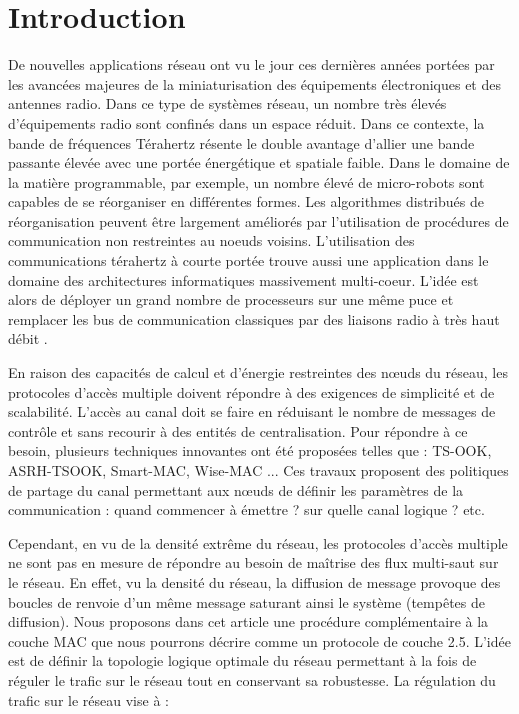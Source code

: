 \documentclass[sigconf]{acmart}
\begin{document}



\maketitle

\section{Introduction}

De nouvelles applications réseau ont vu le jour ces dernières années portées par les avancées majeures de la miniaturisation des équipements électroniques et des antennes radio. Dans ce type de systèmes réseau, un nombre très élevés d'équipements radio sont confinés dans un espace réduit. Dans ce contexte, la bande de fréquences Térahertz résente le double avantage d'allier une bande passante élevée avec une portée énergétique et spatiale faible. Dans le domaine de la matière programmable, par exemple, un nombre élevé de micro-robots sont capables de se réorganiser en différentes formes. Les algorithmes distribués de réorganisation peuvent être largement améliorés par l'utilisation de procédures de communication non restreintes au noeuds voisins. L'utilisation des communications térahertz à courte portée trouve aussi une application dans le domaine des architectures informatiques massivement multi-coeur. L'idée est alors de déployer un grand nombre de processeurs sur une même puce et remplacer les bus de communication classiques par des liaisons radio à très haut débit \cite{abadal}. 

En raison des capacités de calcul et d'énergie restreintes des nœuds du réseau, les protocoles d'accès multiple doivent répondre à des exigences de simplicité et de scalabilité. L'accès au canal doit se faire en réduisant le nombre de messages de contrôle et sans recourir à des entités de centralisation. Pour répondre à ce besoin, plusieurs techniques innovantes ont été proposées telles que : TS-OOK, ASRH-TSOOK, Smart-MAC, Wise-MAC ... Ces travaux proposent des politiques de partage du canal permettant aux nœuds de définir les paramètres de la communication : quand commencer à émettre ? sur quelle canal logique ? etc.

Cependant, en vu de la densité extrême du réseau, les protocoles d'accès multiple ne sont pas en mesure de répondre au besoin de maîtrise des flux multi-saut sur le réseau. En effet, vu la densité du réseau, la diffusion de message provoque des boucles de renvoie d'un même message saturant ainsi le système (tempêtes de diffusion). Nous proposons dans cet article une procédure complémentaire à la couche MAC que nous pourrons décrire comme un protocole de couche 2.5. L'idée est de définir la topologie logique optimale du réseau permettant à la fois de réguler le trafic sur le réseau tout en conservant sa robustesse. La régulation du trafic sur le réseau vise à :
  
\end{document}
